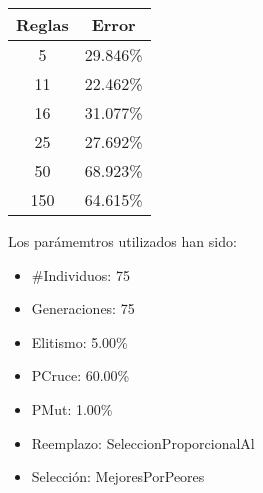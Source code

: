 \begin{center}
\begin{tabular}{cc}
Reglas&Error\\\hline
5 & 29.846\%\\
11 & 22.462\%\\
16 & 31.077\%\\
25 & 27.692\%\\
50 & 68.923\%\\
150 & 64.615\%\\
\end{tabular}
\end{center}
Los par\'amemtros utilizados han sido:\begin{itemize}
\item \#Individuos: 75 \item Generaciones: 75 \item Elitismo: 5.00\%\item PCruce: 60.00\%\item PMut: 1.00\%\item Reemplazo: SeleccionProporcionalAl\item Selecci\'on: MejoresPorPeores
\end{itemize}
